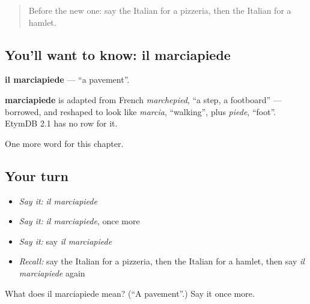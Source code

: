 \begin{quote}
Before the new one: say the Italian for a pizzeria, then the Italian for a hamlet.
\end{quote}

\subsection*{You'll want to know: il marciapiede}
\textbf{il marciapiede} — \textquotedblleft{}a pavement\textquotedblright{}.

\begin{cousinweb}
\textbf{marciapiede} is adapted from French \emph{marchepied}, \textquotedblleft{}a step, a footboard\textquotedblright{} — borrowed, and reshaped to look like \emph{marcia}, \textquotedblleft{}walking\textquotedblright{}, plus \emph{piede}, \textquotedblleft{}foot\textquotedblright{}. EtymDB 2.1 has no row for it.
\end{cousinweb}

\begin{grammarlens}[title={What you've built}]
One more word for this chapter.
\end{grammarlens}

\subsection*{Your turn}
\begin{itemize}
\raggedright
  \item \emph{Say it:} \emph{il marciapiede}
  \item \emph{Say it:} \emph{il marciapiede}, once more
  \item \emph{Say it:} say \emph{il marciapiede}
  \item \emph{Recall:} say the Italian for a pizzeria, then the Italian for a hamlet, then say \emph{il marciapiede} again
\end{itemize}

\begin{tcolorbox}[breakable,colback=teal!4,colframe=teal!35!black,title={Before you move on}]
What does il marciapiede mean? (\textquotedblleft{}A pavement\textquotedblright{}.) Say it once more.
\end{tcolorbox}
